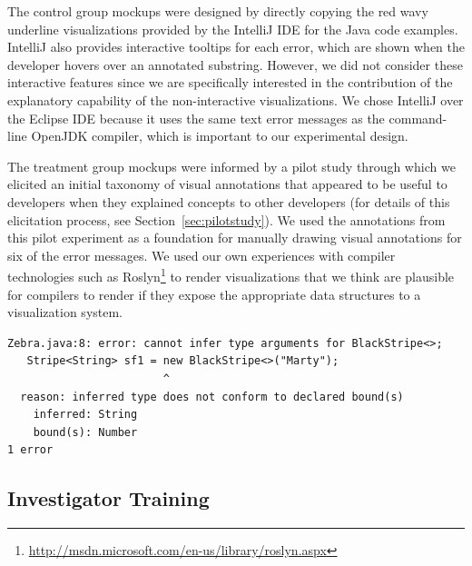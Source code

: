 \documentclass[conference]{IEEEtran}
\begin{document}
The control group mockups were designed by directly copying the red wavy underline visualizations provided by the IntelliJ IDE for the Java code examples. IntelliJ also provides interactive tooltips for each error, which are shown when the developer hovers over an annotated substring. However, we did not consider these interactive features since we are specifically interested in the contribution of the explanatory capability of the non-interactive visualizations. We chose IntelliJ over the Eclipse IDE because it uses the same text error messages as the command-line OpenJDK compiler, which is important to our experimental design.

The treatment group mockups were informed by a pilot study through which we elicited an initial taxonomy of visual annotations that appeared to be useful to developers when they explained concepts to other developers (for details of this elicitation process, see Section~\ref{sec:pilotstudy}). We used the annotations from this pilot experiment as a foundation for manually drawing visual annotations for six of the error messages. 
We used our own experiences with compiler technologies such as Roslyn\footnote{\url{http://msdn.microsoft.com/en-us/library/roslyn.aspx}} to render visualizations that we think are plausible for compilers to render if they expose the appropriate data structures to a visualization system.


\newsavebox{\zebralisting}
\begin{lrbox}{\zebralisting}
\begin{lstlisting}[style=JavaError]
Zebra.java:8: error: cannot infer type arguments for BlackStripe<>;
   Stripe<String> sf1 = new BlackStripe<>("Marty");
                        ^
  reason: inferred type does not conform to declared bound(s)
    inferred: String
    bound(s): Number
1 error
\end{lstlisting}
\end{lrbox}

\subsection{Investigator Training}
\end{document}
